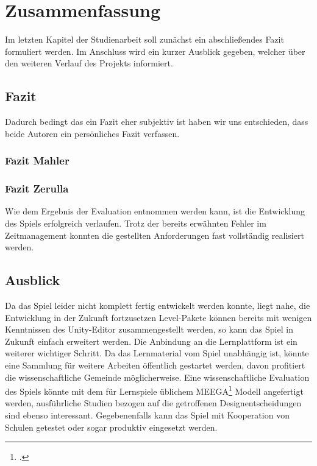 \section{Zusammenfassung}
Im letzten Kapitel der Studienarbeit soll zunächst ein abschließendes Fazit formuliert werden. Im Anschluss wird ein kurzer Ausblick gegeben, welcher über den weiteren Verlauf des Projekts informiert.

\subsection{Fazit}

	Dadurch bedingt das ein Fazit eher subjektiv ist haben wir uns entschieden, dass beide Autoren ein persönliches Fazit verfassen.
	\subsubsection{Fazit Mahler}
	\subsubsection{Fazit Zerulla}

Wie dem Ergebnis der Evaluation entnommen werden kann, ist die Entwicklung des Spiels erfolgreich verlaufen. Trotz der bereits erwähnten Fehler im Zeitmanagement konnten die gestellten Anforderungen fast vollständig realisiert werden. 




\subsection{Ausblick}
	Da das Spiel leider nicht komplett fertig entwickelt werden konnte, liegt nahe, die Entwicklung in der Zukunft fortzusetzen Level-Pakete können bereits mit wenigen Kenntnissen des Unity-Editor zusammengestellt werden, so kann das Spiel in Zukunft einfach erweitert werden. Die Anbindung an die Lernplattform ist ein weiterer wichtiger Schritt.
	Da das Lernmaterial vom Spiel unabhängig ist, könnte eine Sammlung für weitere Arbeiten öffentlich gestartet werden, davon profitiert die wissenschaftliche Gemeinde möglicherweise.
	Eine wissenschaftliche Evaluation des Spiels könnte mit dem für Lernspiele üblichem MEEGA\footcite{psych1} Modell angefertigt werden, ausführliche Studien bezogen auf die getroffenen Designentscheidungen sind ebenso interessant.
	Gegebenenfalls kann das Spiel mit Kooperation von Schulen getestet oder sogar produktiv eingesetzt werden.
